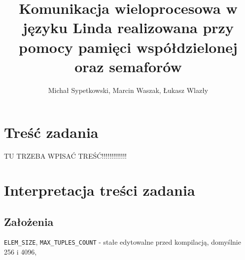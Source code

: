 \documentclass{article}
\title{Komunikacja wieloprocesowa w języku Linda realizowana przy pomocy pamięci współdzielonej oraz semaforów}
\author{Michał Sypetkowski, Marcin Waszak, Łukasz Wlazły}
\date{}
\begin{document}
	\maketitle
	\newpage
	
	\section{Treść zadania}
	TU TRZEBA WPISAĆ TREŚĆ!!!!!!!!!!!!!
	
	\section{Interpretacja treści zadania}
	\subsection{Założenia}
    \texttt{ELEM\_SIZE}, \texttt{MAX\_TUPLES\_COUNT} - stałe edytowalne przed kompilacją, domyślnie 256 i 4096,
\end{document}
